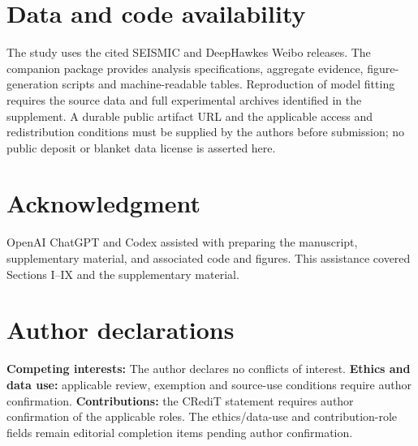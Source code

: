 \section*{Data and code availability}
The study uses the cited SEISMIC and DeepHawkes Weibo releases. The companion package provides analysis specifications, aggregate evidence, figure-generation scripts and machine-readable tables. Reproduction of model fitting requires the source data and full experimental archives identified in the supplement. A durable public artifact URL and the applicable access and redistribution conditions must be supplied by the authors before submission; no public deposit or blanket data license is asserted here.
\section*{Acknowledgment}
OpenAI ChatGPT and Codex \cite{openai2026} assisted with preparing the manuscript, supplementary material, and associated code and figures. This assistance covered Sections I--IX and the supplementary material.
\section*{Author declarations}
\textbf{Competing interests:} The author declares no conflicts of interest. \textbf{Ethics and data use:} applicable review, exemption and source-use conditions require author confirmation. \textbf{Contributions:} the CRediT statement requires author confirmation of the applicable roles. The ethics/data-use and contribution-role fields remain editorial completion items pending author confirmation.
